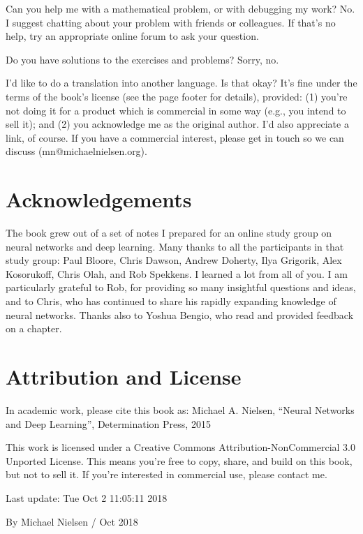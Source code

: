 Can you help me with a mathematical problem, or with debugging my work? No. I suggest chatting about your problem with friends or colleagues. If that's no help, try an appropriate online forum to ask your question.

Do you have solutions to the exercises and problems? Sorry, no.

I'd like to do a translation into another language. Is that okay? It's fine under the terms of the book's license (see the page footer for details), provided: (1) you're not doing it for a product which is commercial in some way (e.g., you intend to sell it); and (2) you acknowledge me as the original author. I'd also appreciate a link, of course. If you have a commercial interest, please get in touch so we can discuss (mn@michaelnielsen.org).


\section*{Acknowledgements}

The book grew out of a set of notes I prepared for an online study group on neural networks and deep learning. Many thanks to all the participants in that study group: Paul Bloore, Chris Dawson, Andrew Doherty, Ilya Grigorik, Alex Kosorukoff, Chris Olah, and Rob Spekkens. I learned a lot from all of you. I am particularly grateful to Rob, for providing so many insightful questions and ideas, and to Chris, who has continued to share his rapidly expanding knowledge of neural networks. Thanks also to Yoshua Bengio, who read and provided feedback on a chapter.

\section*{Attribution and License}

In academic work, please cite this book as: Michael A. Nielsen, ``Neural Networks and Deep Learning'', Determination Press, 2015 

This work is licensed under a Creative Commons Attribution-NonCommercial 3.0 Unported License. This means you're free to copy, share, and build on this book, but not to sell it. If you're interested in commercial use, please contact me. 

Last update: Tue Oct 2 11:05:11 2018 

By Michael Nielsen / Oct 2018 

